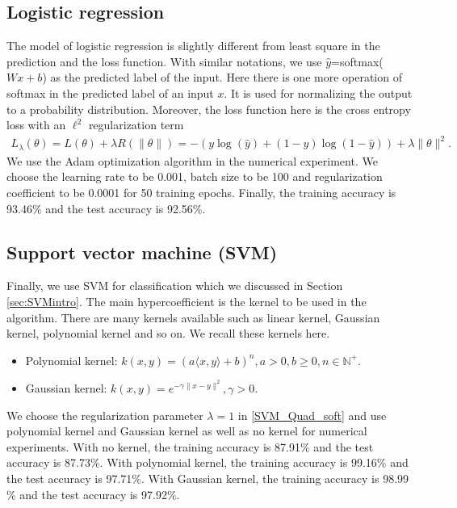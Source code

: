 \subsection{Logistic regression }
The model of logistic regression is slightly different from least square in the prediction and the loss function. With similar notations, we use $\hat{y}$=softmax($Wx+b$) as the predicted label of the input.
Here there is one more operation of softmax in the predicted label of an input $x$. It is used for normalizing the output to a probability distribution. Moreover, the loss function here is the cross entropy loss with an $\ell^2$ regularization term
\begin{align}
L_{\lambda}(\theta)=L(\theta)+\lambda R(\|\theta\|)=
-(y \log(\hat{y})+(1-y)\log(1-\hat{y}))
+\lambda \|\theta\|^2.
\end{align}
We use the {\color{red}Adam} optimization algorithm in the numerical experiment. We choose the learning rate to be 0.001,  batch size to be 100
and regularization coefficient to be 0.0001 for 50 training epochs. Finally, the training accuracy is 93.46$\%$ and the test accuracy is 92.56$\%$. 




\subsection{Support vector machine (SVM) }
Finally, we use SVM for classification which we discussed in Section \ref{sec:SVMintro}. The main hypercoefficient is the kernel to be used in the algorithm. There are many kernels available such as linear kernel, Gaussian kernel, polynomial kernel and so on. We recall these kernels here. 
\begin{itemize}
	\item Polynomial kernel: $k(x,y) = (a\langle x,y\rangle+ b)^n, a > 0, b\geq 0, n\in \mathbb{N}^+$.
	\item Gaussian kernel: $k(x,y) = e^{-\gamma\|x-y\|^2}, \gamma > 0$.
\end{itemize}
We choose the regularization parameter $\lambda=1$ in \eqref{SVM_Quad_soft} and use polynomial kernel 
and Gaussian kernel as well as no kernel 
for numerical experiments. 
With no kernel, the training accuracy is 87.91$\%$ and the test accuracy is 87.73$\%$. 
With polynomial kernel, the training accuracy is 99.16$\%$ and the test accuracy is 97.71$\%$. 
With Gaussian kernel, the training accuracy is 98.99$\%$ and the test accuracy is 97.92$\%$.



